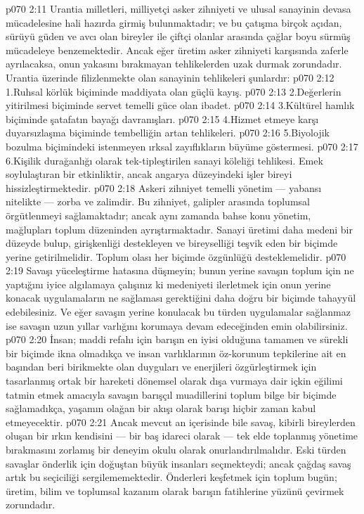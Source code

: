 \vs p070 2:11 Urantia milletleri, milliyetçi asker zihniyeti ve ulusal sanayinin devasa mücadelesine hali hazırda girmiş bulunmaktadır; ve bu çatışma birçok açıdan, sürüyü güden ve avcı olan bireyler ile çiftçi olanlar arasında çağlar boyu sürmüş mücadeleye benzemektedir. Ancak eğer üretim asker zihniyeti karşısında zaferle ayrılacaksa, onun yakasını bırakmayan tehlikelerden uzak durmak zorundadır. Urantia üzerinde filizlenmekte olan sanayinin tehlikeleri şunlardır:
\vs p070 2:12 1.\bibnobreakspace Ruhsal körlük biçiminde maddiyata olan güçlü kayış.
\vs p070 2:13 2.\bibnobreakspace Değerlerin yitirilmesi biçiminde servet temelli güce olan ibadet.
\vs p070 2:14 3.\bibnobreakspace Kültürel hamlık biçiminde şatafatın bayağı davranışları.
\vs p070 2:15 4.\bibnobreakspace Hizmet etmeye karşı duyarsızlaşma biçiminde tembelliğin artan tehlikeleri.
\vs p070 2:16 5.\bibnobreakspace Biyolojik bozulma biçimindeki istenmeyen ırksal zayıflıkların büyüme göstermesi.
\vs p070 2:17 6.\bibnobreakspace Kişilik durağanlığı olarak tek\hyp{}tipleştirilen sanayi köleliği tehlikesi. Emek soylulaştıran bir etkinliktir, ancak angarya düzeyindeki işler bireyi hissizleştirmektedir.
\vs p070 2:18 Askeri zihniyet temelli yönetim --- yabansı nitelikte --- zorba ve zalimdir. Bu zihniyet, galipler arasında toplumsal örgütlenmeyi sağlamaktadır; ancak aynı zamanda bahse konu yönetim, mağlupları toplum düzeninden ayrıştırmaktadır. Sanayi üretimi daha medeni bir düzeyde bulup, girişkenliği destekleyen ve bireyselliği teşvik eden bir biçimde yerine getirilmelidir. Toplum olası her biçimde özgünlüğü desteklemelidir.
\vs p070 2:19 Savaşı yüceleştirme hatasına düşmeyin; bunun yerine savaşın toplum için ne yaptığını iyice algılamaya çalışınız ki medeniyeti ilerletmek için onun yerine konacak uygulamaların ne sağlaması gerektiğini daha doğru bir biçimde tahayyül edebilesiniz. Ve eğer savaşın yerine konulacak bu türden uygulamalar sağlanmaz ise savaşın uzun yıllar varlığını korumaya devam edeceğinden emin olabilirsiniz.
\vs p070 2:20 İnsan; maddi refahı için barışın en iyisi olduğuna tamamen ve sürekli bir biçimde ikna olmadıkça ve insan varlıklarının öz\hyp{}korunum tepkilerine ait en başından beri birikmekte olan duyguları ve enerjileri özgürleştirmek için tasarlanmış ortak bir hareketi dönemsel olarak dışa vurmaya dair içkin eğilimi tatmin etmek amacıyla savaşın barışçıl muadillerini toplum bilge bir biçimde sağlamadıkça, yaşamın olağan bir akışı olarak barışı hiçbir zaman kabul etmeyecektir.
\vs p070 2:21 Ancak mevcut an içerisinde bile savaş, kibirli bireylerden oluşan bir ırkın kendisini --- bir baş idareci olarak --- tek elde toplanmış yönetime bırakmasını zorlamış bir deneyim okulu olarak onurlandırılmalıdır. Eski türden savaşlar önderlik için doğuştan büyük insanları seçmekteydi; ancak çağdaş savaş artık bu seçiciliği sergilememektedir. Önderleri keşfetmek için toplum bugün; üretim, bilim ve toplumsal kazanım olarak barışın fatihlerine yüzünü çevirmek zorundadır.
